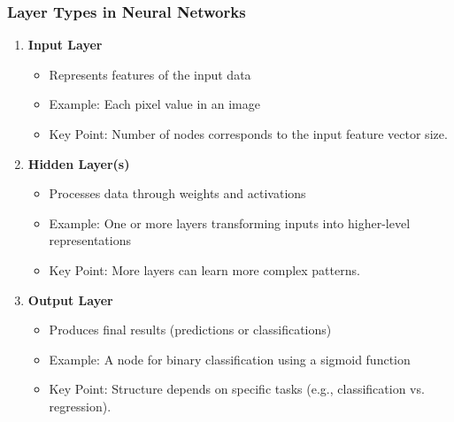 \documentclass[aspectratio=169]{beamer}
\begin{document}
\begin{frame}[fragile]
    \frametitle{Layer Types in Neural Networks}
    
    \begin{enumerate}
        \item \textbf{Input Layer}
            \begin{itemize}
                \item Represents features of the input data
                \item Example: Each pixel value in an image
                \item Key Point: Number of nodes corresponds to the input feature vector size.
            \end{itemize}
        \item \textbf{Hidden Layer(s)}
            \begin{itemize}
                \item Processes data through weights and activations
                \item Example: One or more layers transforming inputs into higher-level representations
                \item Key Point: More layers can learn more complex patterns.
            \end{itemize}
        \item \textbf{Output Layer}
            \begin{itemize}
                \item Produces final results (predictions or classifications)
                \item Example: A node for binary classification using a sigmoid function
                \item Key Point: Structure depends on specific tasks (e.g., classification vs. regression).
            \end{itemize}
    \end{enumerate}
\end{frame}
\end{document}
